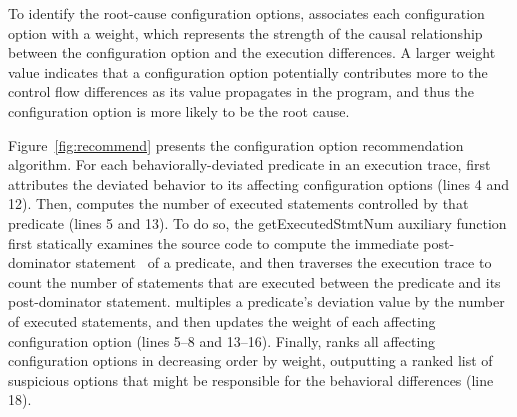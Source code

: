 To identify the root-cause configuration options,
\ourtool associates each
configuration option with a weight, which represents the strength of
the causal relationship between the configuration option
and the execution differences.
A larger weight value indicates that a configuration option
potentially contributes more to the control
flow differences as its value propagates in the program, and thus
the configuration option is more likely to be the root cause.

Figure~\ref{fig:recommend} presents the configuration option
recommendation algorithm.
For each behaviorally-deviated predicate in an execution trace,
\ourtool first attributes the deviated behavior
to its affecting configuration options (lines 4 and 12). Then,
\ourtool computes the number of executed statements controlled
by that predicate (lines 5 and 13). To do so, 
the getExecutedStmtNum auxiliary function first statically examines the
source code to compute the immediate post-dominator statement~\cite{Torczon:2007:EC}
of a predicate, and then traverses the execution trace to count
the number of statements that
are executed between the predicate and its post-dominator
statement. 
\ourtool multiples a predicate's deviation value 
by the number of executed statements, and then updates the
weight of each affecting configuration option (lines 5--8
and 13--16).
Finally, \ourtool ranks all affecting configuration options
in decreasing order by weight, outputting a ranked list of suspicious
options that might be responsible for the
behavioral differences (line 18). 

